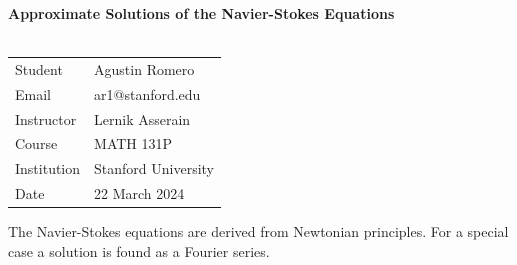 \documentclass{article}
\begin{document}
\begin{center}
\textbf{\Large{Approximate Solutions of the Navier-Stokes Equations}}\\~\\
\begin{tabular}{l l}
Student&Agustin Romero\\
Email&ar1@stanford.edu\\
Instructor&Lernik Asserain\\
Course&MATH 131P\\
Institution&Stanford University\\
Date&22 March 2024\\
\end{tabular}
\end{center}
\begin{abstract}
\end{abstract}
The Navier-Stokes equations are derived from Newtonian principles. For a special case a solution is found as a Fourier series.
\end{document}
